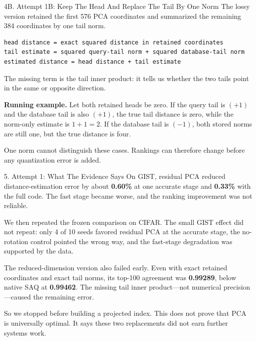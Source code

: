 \documentclass[
  ignorenonframetext,
  aspectratio=169,
]{beamer}
\begin{document}
\begin{frame}[fragile]{4B. Attempt 1B: Keep The Head And Replace The Tail By One Norm}
\small
The lossy version retained the first 576 PCA coordinates and summarized
the remaining 384 coordinates by one tail norm.

\begin{verbatim}
head distance = exact squared distance in retained coordinates
tail estimate = squared query-tail norm + squared database-tail norm
estimated distance = head distance + tail estimate
\end{verbatim}

The missing term is the tail inner product: it tells us whether the two
tails point in the same or opposite direction.

\textbf{Running example.} Let both retained heads be zero. If the query
tail is $(+1)$ and the database tail is also $(+1)$, the true tail distance
is zero, while the norm-only estimate is $1+1=2$. If the database tail is
$(-1)$, both stored norms are still one, but the true distance is four.

One norm cannot distinguish these cases. Rankings can therefore change
before any quantization error is added.
\end{frame}

\begin{frame}{5. Attempt 1: What The Evidence Says}
\protect{}\label{5-attempt-1-what-the-evidence-says}
On GIST, residual PCA reduced distance-estimation error by about
\textbf{0.60\%} at one accurate stage and \textbf{0.33\%} with the full
code. The fast stage became worse, and the ranking improvement was not
reliable.

We then repeated the frozen comparison on CIFAR. The small GIST effect
did not repeat: only 4 of 10 seeds favored residual PCA at the accurate
stage, the no-rotation control pointed the wrong way, and the fast-stage
degradation was supported by the data.

The reduced-dimension version also failed early. Even with exact
retained coordinates and exact tail norms, its top-100 agreement was
\textbf{0.99289}, below native SAQ at \textbf{0.99462}. The missing tail
inner product---not numerical precision---caused the remaining error.

So we stopped before building a projected index. This does not prove
that PCA is universally optimal. It says these two replacements did not
earn further systems work.
\end{frame}
\end{document}
